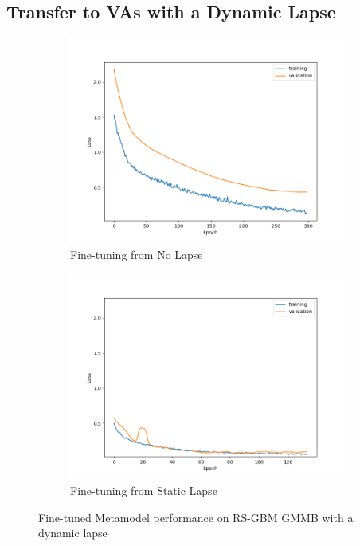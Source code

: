 \subsection{Transfer to VAs with a Dynamic Lapse}

\begin{figure}[ht!]
    \centering
    \begin{subfigure}{0.48\textwidth}
        \includegraphics[width=\textwidth]{./project3/figures/figure2a.png}
        \caption{Fine-tuning from No Lapse} 
        \label{subfig3-2:fromNolapse}
    \end{subfigure}\hfill
    \begin{subfigure}{0.48\textwidth}
        \includegraphics[width=\textwidth]{./project3/figures/figure2b.png}
        \caption{Fine-tuning from Static Lapse}
        \label{subfig3-2:fromLapse}
    \end{subfigure}
    \caption{Fine-tuned Metamodel performance on RS-GBM GMMB with a dynamic lapse}
    \label{fig3:figure2}
\end{figure}

